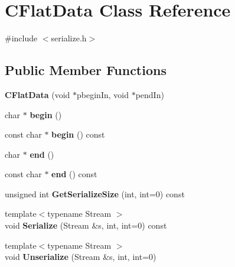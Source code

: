 \hypertarget{class_c_flat_data}{}\section{C\+Flat\+Data Class Reference}
\label{class_c_flat_data}


{\ttfamily \#include $<$serialize.\+h$>$}

\subsection*{Public Member Functions}
\begin{DoxyCompactItemize}
\item 
\mbox{\label{class_c_flat_data_afd4036c45c69e6b080f57d793e1bdf57}} 
{\bfseries C\+Flat\+Data} (void $\ast$pbegin\+In, void $\ast$pend\+In)
\item 
\mbox{\label{class_c_flat_data_ac8131cc3aec84905d7786fb19ff8953d}} 
char $\ast$ {\bfseries begin} ()
\item 
\mbox{\label{class_c_flat_data_a0c771a8143c468a9f7add8b3d9736212}} 
const char $\ast$ {\bfseries begin} () const
\item 
\mbox{\label{class_c_flat_data_ae88ae9f4121ff18aa8e29a3a40d7ee67}} 
char $\ast$ {\bfseries end} ()
\item 
\mbox{\label{class_c_flat_data_af5c2476dcbc0ec0d4f9051df3cdb756d}} 
const char $\ast$ {\bfseries end} () const
\item 
\mbox{\label{class_c_flat_data_ae47ed62d67cc6d923d6c8f9dde7a940c}} 
unsigned int {\bfseries Get\+Serialize\+Size} (int, int=0) const
\item 
\mbox{\label{class_c_flat_data_a97449211175d7fbbb88830cbba808132}} 
{\footnotesize template$<$typename Stream $>$ }\\void {\bfseries Serialize} (Stream \&s, int, int=0) const
\item 
\mbox{\label{class_c_flat_data_a3da79327bf2937113de502182ee227b9}} 
{\footnotesize template$<$typename Stream $>$ }\\void {\bfseries Unserialize} (Stream \&s, int, int=0)
\end{DoxyCompactItemize}
